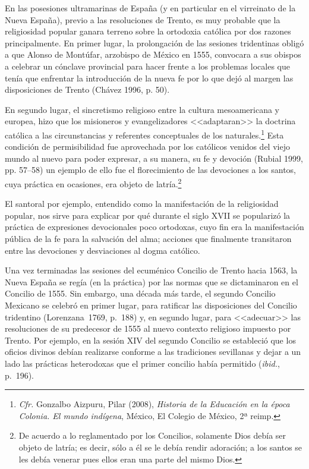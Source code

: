 En las posesiones ultramarinas de España (y en particular en el virreinato de la
Nueva España), previo a las resoluciones de Trento, es muy probable que la
religiosidad popular ganara terreno sobre la ortodoxia católica por dos razones
principalmente. En primer lugar, la prolongación de las sesiones tridentinas
obligó a que Alonso de Montúfar, arzobispo de México en 1555, convocara a sus
obispos a celebrar un cónclave provincial para hacer frente a los problemas
locales que tenía que enfrentar la introducción de la nueva fe por lo que dejó
al margen las disposiciones de Trento (Chávez 1996, p. 50).

En segundo lugar, el sincretismo religioso entre la cultura mesoamericana y
europea, hizo que los misioneros y evangelizadores <<adaptaran>> la doctrina
católica a las circunstancias y referentes conceptuales de los
naturales.\footnote{\textit{Cfr.} Gonzalbo
Aizpuru, Pilar (2008), \textit{Historia de la Educación en la época Colonia. El
mundo indígena}, México, El Colegio de México, 2ª reimp.} Esta condición de
permisibilidad fue aprovechada por los católicos venidos del viejo mundo al
nuevo para poder expresar, a su manera, su fe y devoción (Rubial 1999, pp. 57--58)
un ejemplo de ello fue el florecimiento de las devociones a los santos, cuya
práctica en ocasiones, era objeto de latría.\footnote{De acuerdo a lo reglamentado por
los Concilios, solamente Dios debía ser objeto de latría; es decir, sólo a él
se le debía rendir adoración; a los santos se les debía venerar pues ellos eran
una parte del mismo Dios.}
\enlargethispage{-1\baselineskip}
 
El santoral por ejemplo, entendido como la manifestación de la religiosidad
popular, nos sirve para explicar por qué durante el siglo XVII se popularizó la
práctica de expresiones devocionales  poco ortodoxas, cuyo fin era la
manifestación pública de la fe para la salvación del alma; acciones que
finalmente transitaron entre las devociones y desviaciones al dogma católico.


Una vez terminadas las sesiones del ecuménico Concilio de Trento hacia 1563, la
Nueva España se regía (en la práctica) por las normas que se dictaminaron en el
Concilio de 1555. Sin embargo, una década más tarde, el segundo Concilio
Mexicano se celebró en primer lugar, para ratificar las disposiciones del
Concilio tridentino (Lorenzana~1769, p.~188) y, en segundo lugar, para <<adecuar>>
las resoluciones de su predecesor de 1555 al nuevo contexto religioso impuesto
por Trento. Por ejemplo, en la sesión XIV del segundo Concilio se estableció
que los oficios divinos debían realizarse conforme a las tradiciones sevillanas
y dejar a un lado las prácticas heterodoxas que el primer concilio había
permitido (\textit{ibid.}, p.~196).
\enlargethispage{1\baselineskip}



